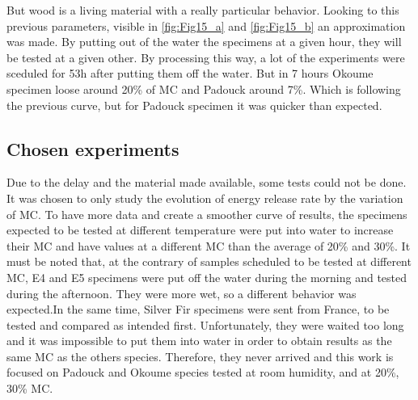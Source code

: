 But wood is a living material with a really particular behavior. Looking to this previous parameters, visible in \ref{fig:Fig15_a} and \ref{fig:Fig15_b} an approximation was made. By putting out of the water the specimens at a given hour, they will be tested at a given other. By processing this way, a lot of the experiments were sceduled for 53h after putting them off the water. But in 7 hours Okoume specimen loose around 20\% of MC and Padouck around 7\%. Which is following the previous curve, but for Padouck specimen it was quicker than expected.


\subsection{Chosen experiments}

Due to the delay and the material made available, some tests could not be done. It was chosen to only study the evolution of energy release rate by the variation of MC. To have more data and create a smoother curve of results, the specimens expected to be tested at different temperature were put into water to increase their MC and have values at a different MC than the average of 20\% and 30\%. It must be noted that, at the contrary of samples scheduled to be tested at different MC, E4 and E5 specimens were put off the water during the morning and tested during the afternoon. They were more wet, so a different behavior was expected.In the same time, Silver Fir specimens were sent from France, to be tested and compared as intended first. Unfortunately, they were waited too long and it was impossible to put them into water in order to obtain results as the same MC as the others species. Therefore, they never arrived and this work is focused on Padouck and Okoume species tested at room humidity, and at 20\%, 30\% MC.



